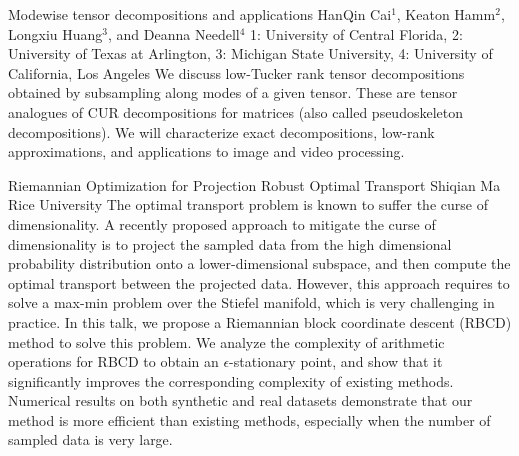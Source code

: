 \vspace{1.5ex}
\abs
{Modewise tensor decompositions and applications}
{HanQin Cai$^{1}$, Keaton Hamm$^{2}$, Longxiu Huang$^{3}$, and Deanna Needell$^{4}$}
{1: University of Central Florida, 2: University of Texas at Arlington, 3: Michigan State University, 4: University of California, Los Angeles}
{We discuss low-Tucker rank tensor decompositions obtained by subsampling along modes of a given tensor. These are tensor analogues of CUR decompositions for matrices (also called pseudoskeleton decompositions). We will characterize exact decompositions, low-rank approximations, and applications to image and video processing.}


\vspace{1.5ex}
\abs
{Riemannian Optimization for Projection Robust Optimal Transport}
{Shiqian Ma}
{Rice University}
{The optimal transport problem is known to suffer the curse of dimensionality. A recently proposed approach to mitigate the curse of dimensionality is to project the sampled data from the high dimensional probability distribution onto a lower-dimensional subspace, and then compute the optimal transport between the projected data. However, this approach requires to solve a max-min problem over the Stiefel manifold, which is very challenging in practice. In this talk, we propose a Riemannian block coordinate descent (RBCD) method to solve this problem. We analyze the complexity of arithmetic operations for RBCD to obtain an $\epsilon$-stationary point, and show that it significantly improves the corresponding complexity of existing methods. Numerical results on both synthetic and real datasets demonstrate that our method is more efficient than existing methods, especially when the number of sampled data is very large.}